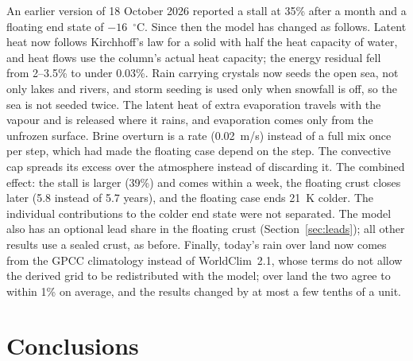 \documentclass[11pt,a4paper]{article}
\newcommand{\degC}{$^{\circ}$C}
\begin{document}
An earlier version of 18 October 2026 reported a stall at 35\% after a month and a floating end state of $-16$~\degC. Since then the model has changed as follows. Latent heat now follows Kirchhoff's law for a solid with half the heat capacity of water, and heat flows use the column's actual heat capacity; the energy residual fell from 2--3.5\% to under 0.03\%. Rain carrying crystals now seeds the open sea, not only lakes and rivers, and storm seeding is used only when snowfall is off, so the sea is not seeded twice. The latent heat of extra evaporation travels with the vapour and is released where it rains, and evaporation comes only from the unfrozen surface. Brine overturn is a rate (0.02~m/s) instead of a full mix once per step, which had made the floating case depend on the step. The convective cap spreads its excess over the atmosphere instead of discarding it. The combined effect: the stall is larger (39\%) and comes within a week, the floating crust closes later (5.8 instead of 5.7 years), and the floating case ends 21~K colder. The individual contributions to the colder end state were not separated. The model also has an optional lead share in the floating crust (Section~\ref{sec:leads}); all other results use a sealed crust, as before. Finally, today's rain over land now comes from the GPCC climatology instead of WorldClim~2.1, whose terms do not allow the derived grid to be redistributed with the model; over land the two agree to within 1\% on average, and the results changed by at most a few tenths of a unit.

\section{Conclusions}
\label{sec:conc}
\end{document}
